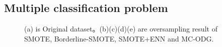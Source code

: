 \documentclass[runningheads]{llncs}
\begin{document}
\subsection{Multiple classification problem}
\begin{figure}[htbp]
  \centering
  \quad
  \quad

  \quad
  \quad
  \caption{(a) is Original dataset。(b)(c)(d)(e) are oversampling result of SMOTE, 
  Borderline-SMOTE, SMOTE+ENN and MC-ODG.}
  \label{fig17}
  \end{figure}
\end{document}
